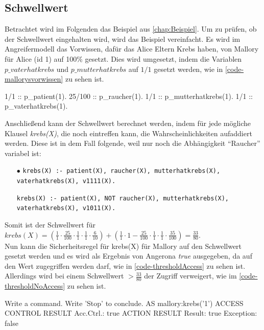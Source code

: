 \documentclass[german,version-2020-11]{uzl-thesis}
\begin{document}
\subsection{Schwellwert}\label{sub:schwellwert}
Betrachtet wird im Folgenden das Beispiel aus \autoref{chap:Beispiel}. Um zu prüfen, ob der Schwellwert eingehalten wird, wird das Beispiel vereinfacht. Es wird im Angreifermodell das Vorwissen, dafür das Alice Eltern Krebs haben, von Mallory für Alice (id 1) auf 100\% gesetzt. Dies wird umgesetzt, indem die Variablen $p\_vaterhatkrebs$ und $p\_mutterhatkrebs$ auf $1/1$ gesetzt werden, wie in \autoref{code-mallorysvorwissen} zu sehen ist.
\begin{Pseudocode}[caption={Mallorys Vorwissen}, label={code-mallorysvorwissen}]
1/1 :: p_patient(1).
25/100 :: p_raucher(1).
1/1 :: p_mutterhatkrebs(1).
1/1 :: p_vaterhatkrebs(1).
\end{Pseudocode}
Anschließend kann der Schwellwert berechnet werden, indem für jede mögliche Klausel \textit{krebs(X)}, die noch eintreffen kann, die Wahrscheinlichkeiten aufaddiert werden. Diese ist in dem Fall folgende, weil nur noch die Abhängigkeit \enquote{Raucher} variabel ist:
\begin{itemize}
	\item[$\bullet$] \texttt{krebs(X) :- patient(X), raucher(X), mutterhatkrebs(X), vaterhatkrebs(X), v1111(X).}
	\item[\bullet] \texttt{krebs(X) :- patient(X), NOT raucher(X), mutterhatkrebs(X), vaterhatkrebs(X), v1011(X).}
\end{itemize}
Somit ist der Schwellwert für $krebs(X) = (\frac{1}{1} \cdot \frac{25}{100} \cdot \frac{1}{1} \cdot \frac{1}{1} \cdot \frac{6}{10}) + (\frac{1}{1} \cdot 1- \frac{25}{100} \cdot \frac{1}{1} \cdot \frac{1}{1} \cdot \frac{35}{100}) = \frac{33}{80} $. \\  Nun kann die Sicherheitsregel für krebs(X) für Mallory auf den Schwellwert gesetzt werden und es wird als Ergebnis von Angerona \textit{true} ausgegeben, da auf den Wert zugegriffen werden darf, wie in \autoref{code-thresholdAccess} zu sehen ist. Allerdings wird bei einem Schwellwert $ > \frac{33}{80}$ der Zugriff verweigert, wie im \autoref{code-thresholdNoAccess} zu sehen ist. 


\begin{Pseudocode}[caption={Angerona Ergebnis für den Schwellwert $33/80$}, label={code-thresholdAccess}]
Write a command. Write 'Stop' to conclude.
AS mallory:krebs('1')
ACCESS CONTROL RESULT
	Acc.Ctrl.: true
ACTION RESULT
	Result: true Exception: false
\end{Pseudocode}
\end{document}
